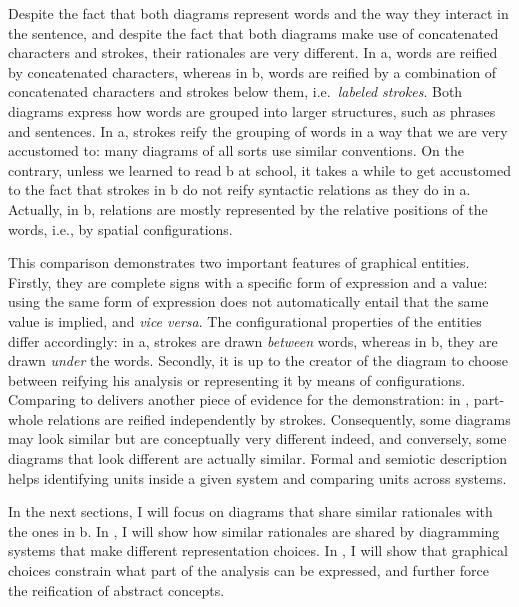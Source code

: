 \documentclass[english,output=paper,colorlinks,citecolor=brown]{../langscibook}
\begin{document}
Despite the fact that both diagrams represent words and the way they interact in the sentence, and despite the fact that both diagrams make use of concatenated characters and strokes, their rationales are very different. In a, words are reified by concatenated characters, whereas in b, words are reified by a combination of concatenated characters and strokes below them, i.e.~\textit{labeled strokes}. Both diagrams express how words are grouped into larger structures, such as phrases and sentences. In a, strokes reify the grouping of words in a way that we are very accustomed to: many diagrams of all sorts use similar conventions. On the contrary, unless we learned to read b at school, it takes a while to get accustomed to the fact that strokes in b do not reify syntactic relations as they do in a. Actually, in b, relations are mostly represented by the relative positions of the words, i.e., by spatial configurations.

This comparison demonstrates two important features of graphical entities. Firstly, they are complete signs with a specific form of expression and a value: using the same form of expression does not automatically entail that the same value is implied, and \textit{vice versa}. The configurational properties of the entities differ accordingly: in a, strokes are drawn \textit{between} words, whereas in b, they are drawn \textit{under} the words. Secondly, it is up to the creator of the diagram to choose between reifying his analysis or representing it by means of configurations. Comparing  to  delivers another piece of evidence for the demonstration: in , part-whole relations are reified independently by strokes. Consequently, some diagrams may look similar but are conceptually very different indeed, and conversely, some diagrams that look different are actually similar. Formal and semiotic description helps identifying units inside a given system and comparing units across systems. 

In the next sections, I will focus on diagrams that share similar rationales with the ones in b. In , I will show how similar rationales are shared by diagramming systems that make different representation choices. In , I will show that graphical choices constrain what part of the analysis can be expressed, and further force the reification of abstract concepts.
\end{document}
